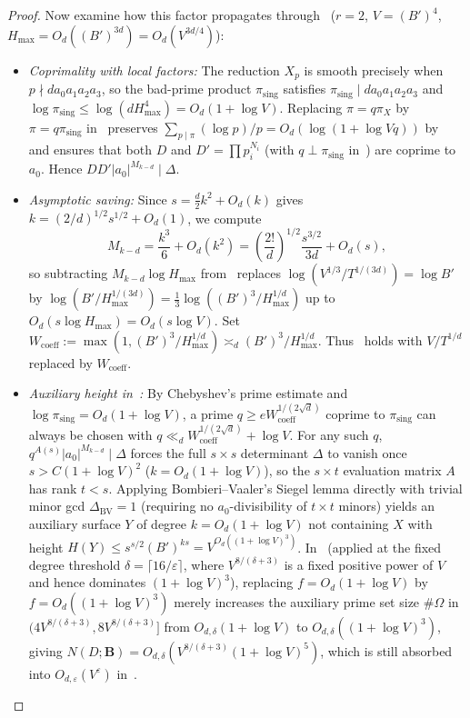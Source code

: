 \documentclass[11pt,a4paper]{amsart}
\theoremstyle{plain}
\theoremstyle{definition}
\theoremstyle{remark}
\begin{document}
\begin{proof}
Now examine how this factor propagates through~\cite[Sections~1--3]{Salberger2023} ($r = 2$, $V = (B')^4$, $H_{\max} = O_d((B')^{3d}) = O_d(V^{3d/4})$):
\begin{itemize}[itemsep=1pt]
\item \emph{Coprimality with local factors:} The reduction $X_p$ is smooth precisely when $p \nmid d a_0 a_1 a_2 a_3$, so the bad-prime product $\pi_{\mathrm{sing}}$ satisfies $\pi_{\mathrm{sing}} \mid d a_0 a_1 a_2 a_3$ and $\log \pi_{\mathrm{sing}} \le \log(d H_{\max}^4) = O_d(1 + \log V)$. Replacing $\pi = q \pi_X$ by $\pi = q \pi_{\mathrm{sing}}$ in~\cite[Theorem~2.2]{Salberger2023} preserves $\sum_{p \mid \pi} (\log p)/p = O_d(\log(1 + \log V q))$ by~\cite[Lemma~1.10]{Salberger2023} and ensures that both $D$ and $D' = \prod p_i^{N_i}$ (with $q \perp \pi_{\mathrm{sing}}$ in~\cite[Main Lemma~3.2(i)]{Salberger2023}) are coprime to $a_0$. Hence $D D' |a_0|^{M_{k-d}} \mid \Delta$.
\item \emph{Asymptotic saving:} Since $s = \frac{d}{2} k^2 + O_d(k)$ gives $k = (2/d)^{1/2} s^{1/2} + O_d(1)$, we compute
\[
  M_{k-d} = \frac{k^3}{6} + O_d(k^2) = \left(\frac{2!}{d}\right)^{1/2} \frac{s^{3/2}}{3 d} + O_d(s),
\]
so subtracting $M_{k-d}\log H_{\max}$ from~\cite[eq.~(1.12)]{Salberger2023} replaces $\log(V^{1/3}/T^{1/(3d)}) = \log B'$ by $\log(B'/H_{\max}^{1/(3d)}) = \frac{1}{3}\log((B')^3/H_{\max}^{1/d})$ up to $O_d(s \log H_{\max}) = O_d(s \log V)$. Set $W_{\mathrm{coeff}} := \max(1, (B')^3/H_{\max}^{1/d}) \asymp_d (B')^3/H_{\max}^{1/d}$. Thus~\cite[Theorem~2.2]{Salberger2023} holds with $V/T^{1/d}$ replaced by $W_{\mathrm{coeff}}$.
\item \emph{Auxiliary height in~\cite[Lemma~2.8 and Lemma~3.13]{Salberger2023}:} By Chebyshev's prime estimate and $\log \pi_{\mathrm{sing}} = O_d(1 + \log V)$, a prime $q \ge e W_{\mathrm{coeff}}^{1/(2\sqrt{d})}$ coprime to $\pi_{\mathrm{sing}}$ can always be chosen with $q \ll_d W_{\mathrm{coeff}}^{1/(2\sqrt{d})} + \log V$. For any such $q$, $q^{A(s)} |a_0|^{M_{k-d}} \mid \Delta$ forces the full $s \times s$ determinant $\Delta$ to vanish once $s > C(1 + \log V)^2$ ($k = O_d(1 + \log V)$), so the $s \times t$ evaluation matrix $A$ has rank $t < s$. Applying Bombieri--Vaaler's Siegel lemma directly with trivial minor gcd $\Delta_{\mathrm{BV}} = 1$ (requiring no $a_0$-divisibility of $t \times t$ minors) yields an auxiliary surface $Y$ of degree $k = O_d(1 + \log V)$ not containing $X$ with height $H(Y) \le s^{s/2} (B')^{ks} = V^{O_d((1+\log V)^3)}$. In~\cite[Lemma~3.13]{Salberger2023} (applied at the fixed degree threshold $\delta = \lceil 16/\varepsilon \rceil$, where $V^{8/(\delta+3)}$ is a fixed positive power of $V$ and hence dominates $(1+\log V)^3$), replacing $f = O_d(1 + \log V)$ by $f = O_d((1 + \log V)^3)$ merely increases the auxiliary prime set size $\#\Omega$ in $(4 V^{8/(\delta+3)}, 8 V^{8/(\delta+3)}]$ from $O_{d,\delta}(1+\log V)$ to $O_{d,\delta}((1+\log V)^3)$, giving $N(D; \mathbf{B}) = O_{d,\delta}(V^{8/(\delta+3)}(1 + \log V)^5)$, which is still absorbed into $O_{d,\varepsilon}(V^\varepsilon)$ in~\cite[Theorem~3.16]{Salberger2023}.

\end{itemize}
\end{proof}
\end{document}
